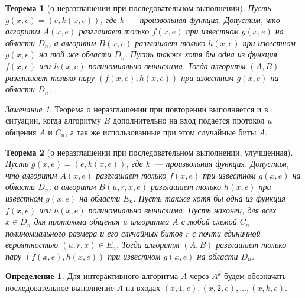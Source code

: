 \documentclass[12pt,a4paper]{article}
\theoremstyle{definition}
\newtheorem{definition}{Определение}[section]
\theoremstyle{plain}
\newtheorem{theorem}{Теорема}[section]
\theoremstyle{remark}
\newtheorem{remark}{Замечание}[section]
\begin{document}
\begin{theorem}[о неразглашении при последовательном выполнении]
\label{thm:repetition-knowledge}
Пусть $g(x,e) = (e, k(x,e))$, где $k$~--- произвольная функция.
Допустим, что алгоритм $A(x,e)$ разглашает только $f(x,e)$ при
известном $g(x,e)$ на области $D_n$, а алгоритм $B(x,e)$ разглашает
только $h(x,e)$ при известном $g(x,e)$ на той же области $D_n$.
Пусть также хотя бы одна из функция $f(x,e)$ или $h(x,e)$ полиномиально
вычислима. Тогда алгоритм $(A,B)$ разглашает только пару $(f(x,e),h(x,e))$
при известном $g(x,e)$ на области $D_n$.
\end{theorem}
\begin{remark}
Теорема о неразглашении при повторении выполняется и в ситуации, когда
алгоритму $B$ дополнительно на вход подаётся протокол $u$ общения $A$ и $C_n$,
а так же использованные при этом случайные биты $A$.
\end{remark}
\begin{theorem}[о неразглашении при последовательном выполнении, улучшенная]
Пусть $g(x,e) = (e, k(x,e))$, где $k$~--- произвольная функция.
Допустим, что алгоритм $A(x,e)$ разглашает только $f(x,e)$ при
известном $g(x,e)$ на области $D_n$, а алгоритм $B(u, r, x,e)$ разглашает
только $h(x,e)$ при известном $g(x,e)$ на области $E_n$.
Пусть также хотя бы одна из функция $f(x,e)$ или $h(x,e)$ полиномиально
вычислима. Пусть наконец, для всех $x\in D_n$ для протокола общения
$u$ алгоритма $A$ с любой схемой $C_n$ полиномиального размера и его случайных битов $r$
с почти единичной вероятностью $(u,r,x)\in E_n$. 
Тогда алгоритм $(A,B)$ разглашает только пару $(f(x,e),h(x,e))$
при известном $g(x,e)$ на области $D_n$.
\end{theorem}

\begin{definition}
Для интерактивного алгоритма $A$ через $A^{k}$ будем обозначать 
последовательное выполнение $A$ на входах $(x,1,e),(x,2,e),\dotsc,(x,k,e)$.
\end{definition}
\end{document}
